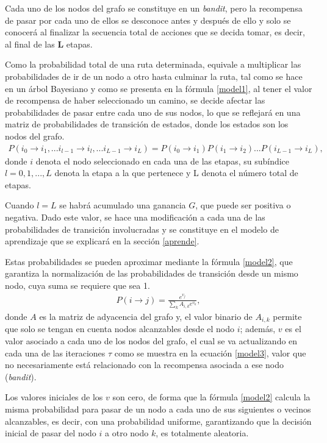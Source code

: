 Cada uno de los nodos del grafo se constituye en un \textit{ bandit}, pero la recompensa de pasar por cada uno de ellos se desconoce antes y después de ello y solo se conocerá al finalizar la secuencia total de acciones que se decida tomar, es decir, al final de las \textbf{L} etapas.

Como la probabilidad total de una ruta determinada, equivale a multiplicar las probabilidades de ir de un nodo a otro hasta culminar la ruta, tal como se hace en un árbol Bayesiano y como se presenta en la fórmula \ref{model1}, al tener el valor de recompensa de haber seleccionado un camino, se decide afectar las probabilidades de pasar entre cada uno de sus nodos, lo que se reflejará en una matriz de probabilidades de transición de estados, donde los estados son los nodos del grafo.
\begin{eqnarray}\label{model1}
P(i_{0} \to i_{1}, ... i_{l-1} \to i_{l}, ... i_{L-1} \to i_{L})=P(i_{0} \to i_{1})P(i_{1} \to i_{2})...P(i_{L-1} \to i_{L}),
\end{eqnarray}
donde $i$ denota el nodo seleccionado en cada una de las etapas, su subíndice $l=0,1,...,L$ denota la etapa a la que pertenece y L denota el número total de etapas. 

Cuando $l = L$ se habrá acumulado una ganancia $G$, que puede ser positiva o negativa. Dado este valor, se hace una modificación a cada una de las probabilidades de transición involucradas y se constituye en el modelo de aprendizaje que se explicará en la sección \ref{aprende}.

Estas probabilidades se pueden aproximar mediante la fórmula \ref{model2}, que garantiza la normalización de las probabilidades de transición desde un mismo nodo, cuya suma se requiere que sea 1.
\begin{eqnarray}\label{model2}
P(i \to j) = \frac{e^{v_j}}{\sum_k A_{i,k} e^{v_k}},
\end{eqnarray}
donde $A$ es la matriz de adyacencia del grafo y, el valor binario de $A_{i,k}$ permite que solo se tengan en cuenta nodos alcanzables desde el nodo $i$; además, $v$ es el valor asociado a cada uno de los nodos del grafo, el cual se va actualizando en cada una de las iteraciones $\tau$ como se muestra en la ecuación \ref{model3}, valor que no necesariamente está relacionado con la recompensa asociada a ese nodo (\textit{bandit}).

Los valores iniciales de los $v$ son cero, de forma que la fórmula \ref{model2} calcula la misma probabilidad para pasar de un nodo a cada uno de sus siguientes o vecinos alcanzables, es decir, con una probabilidad uniforme, garantizando que la decisión inicial de pasar del nodo $i$ a otro nodo $k$, es totalmente aleatoria.

